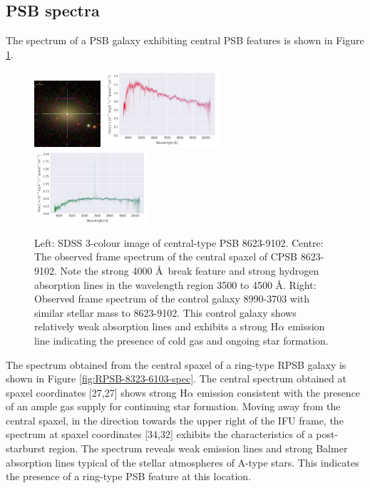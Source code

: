\subsection{PSB spectra}
The spectrum of a PSB galaxy exhibiting central PSB features is shown in Figure \ref{fig:CPSB-8623-9102-spec}.
\begin{figure}
    \centering
    \includegraphics[width=0.22\textwidth]{images/Cutouts/CPSB-8623-9102-IM.png}
    \hfill
    \includegraphics[width=0.38\textwidth]{images/Spectra/CPSB-8623-9102.png}
    \hfill
    \includegraphics[width=0.38\textwidth]{images/Spectra/CPSB-CTRL-8990-3703-spec.png}
    \caption[Central spaxel spectrum of CPSB 8623-9102]{Left: SDSS 3-colour image of central-type PSB 8623-9102. 
    Centre: The observed frame spectrum of the central spaxel of CPSB  8623-9102. Note the strong 4000 \AA\ break feature and strong hydrogen absorption lines in the wavelength region 3500 to 4500 \AA.
    Right: Observed frame spectrum of the control galaxy 8990-3703 with similar stellar mass to 8623-9102. This control galaxy shows relatively weak absorption lines and exhibits a strong H$\alpha$ emission line indicating the presence of cold gas and ongoing star formation.}
    \label{fig:CPSB-8623-9102-spec}
\end{figure}


The spectrum obtained from the central spaxel of a ring-type RPSB galaxy is shown in Figure \ref{fig:RPSB-8323-6103-spec}. The central spectrum obtained at spaxel coordinates [27,27] shows strong H$\alpha$ emission consistent with the presence of an ample gas supply for continuing star formation. Moving away from the central spaxel, in the direction towards the upper right of the IFU frame, the spectrum at spaxel coordinates [34,32] exhibits the characteristics of a post-starburst region. The spectrum reveals weak emission lines and strong Balmer absorption lines typical of the stellar atmospheres of A-type stars. This indicates the presence of a ring-type PSB feature at this location.

